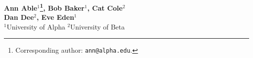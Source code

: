 \textbf{%
  Ann Able$^{1}$\thanks{Corresponding author: \texttt{ann@alpha.edu}.},
  Bob Baker$^{1}$,
  Cat Cole$^{2}$} \\
\textbf{Dan Dee$^{2}$, Eve Eden$^{1}$} \\[0.5em]
$^{1}$University of Alpha
\qquad
$^{2}$University of Beta
